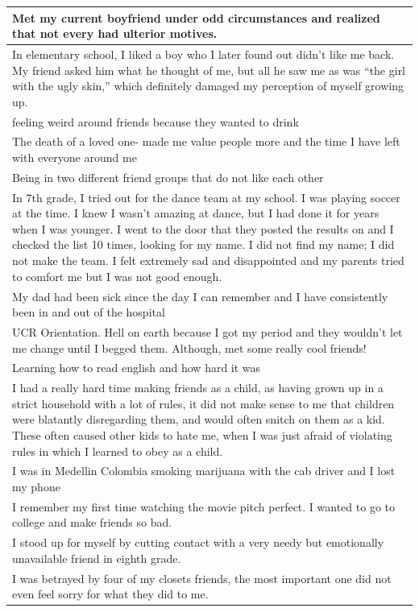 \documentclass[
  .7em,
  letterpaper,
  DIV=11,
  numbers=noendperiod]{scrartcl}
\begin{document}
\begin{table}
\begin{tabular}{l}
\hline
Met my current boyfriend under odd circumstances and realized that not every had ulterior motives.\\
\hline
In elementary school, I liked a boy who I later found out didn’t like me back. My friend asked him what he thought of me, but all he saw me as was “the girl with the ugly skin,” which definitely damaged my perception of myself growing up.\\
\hline
feeling weird around friends because they wanted to drink\\
\hline
The death of a loved one- made me value people more and the time I have left with everyone around me\\
\hline
Being in two different friend groups that do not like each other\\
\hline
In 7th grade, I tried out for the dance team at my school. I was playing soccer at the time. I knew I wasn't amazing at dance, but I had done it for years when I was younger. I went to the door that they posted the results on and I checked the list 10 times, looking for my name. I did not find my name; I did not make the team. I felt extremely sad and disappointed and my parents tried to comfort me but I was not good enough.\\
\hline
My dad had been sick since the day I can remember and I have consistently been in and out of the hospital\\
\hline
UCR Orientation. Hell on earth because I got my period and they wouldn't let me change until I begged them. Although, met some really cool friends!\\
\hline
Learning how to read english and how hard it was\\
\hline
I had a really hard time making friends as a child, as having grown up in a strict household with a lot of rules, it did not make sense to me that children were blatantly disregarding them, and would often snitch on them as a kid. These often caused other kids to hate me, when I was just afraid of violating rules in which I learned to obey as a child.\\
\hline
I was in Medellin Colombia smoking marijuana with the cab driver and I lost my phone\\
\hline
I remember my first time watching the movie pitch perfect. I wanted to go to college and make friends so bad.\\
\hline
I stood up for myself by cutting contact with a very needy but emotionally unavailable friend in eighth grade.\\
\hline
I was betrayed by four of my closets friends, the most important one did not even feel sorry for what they did to me.\\

\end{tabular}
\end{table}
\end{document}
